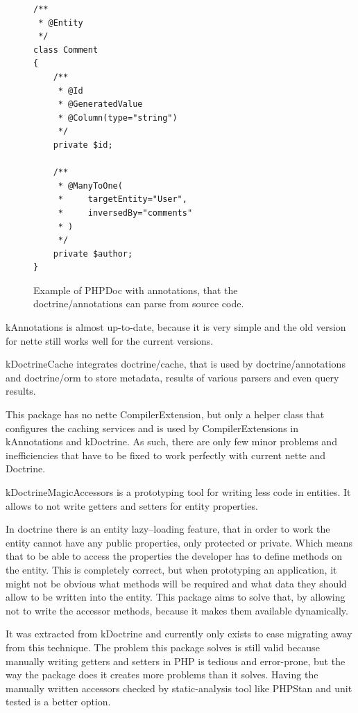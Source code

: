 \begin{figure} \label{fig:php:annotations-example}
\begin{lstlisting}
/**
 * @Entity
 */
class Comment
{
    /**
     * @Id
     * @GeneratedValue
     * @Column(type="string")
     */
    private $id;

    /**
     * @ManyToOne(
     *     targetEntity="User",
     *     inversedBy="comments"
     * )
     */
    private $author;
}
\end{lstlisting}
\caption{Example of PHPDoc with annotations, that the doctrine/annotations can parse from source code.}
\end{figure}

\gls{kAnnotations} is almost up-to-date, because it is very simple and the old version for \gls{nette} still works well for the current versions.

 \label{sec:state:doctrine-cache}

\gls{kDoctrineCache} integrates doctrine/cache, that is used by doctrine/annotations and doctrine/orm to store metadata, results of various parsers and even query results.

This package has no \gls{nette} CompilerExtension, but only a helper class that configures the caching services and is used by CompilerExtensions in \gls{kAnnotations} and \gls{kDoctrine}. As such, there are only few minor problems and inefficiencies that have to be fixed to work perfectly with current \gls{nette} and Doctrine.

 \label{sec:state:doctrine-magic-accessors}

\gls{kDoctrineMagicAccessors} is a prototyping tool for writing less code in entities. It allows to not write getters and setters for entity properties.

In \gls{doctrine} there is an entity lazy--loading feature, that in order to work the entity cannot have any public properties, only protected or private. Which means that to be able to access the properties the developer has to define methods on the entity. This is completely correct, but when prototyping an application, it might not be obvious what methods will be required and what data they should allow to be written into the entity. This package aims to solve that, by allowing not to write the accessor methods, because it makes them available dynamically.

It was extracted from \gls{kDoctrine} and currently only exists to ease migrating away from this technique. The problem this package solves is still valid because manually writing getters and setters in PHP is tedious and error-prone, but the way the package does it creates more problems than it solves. Having the manually written accessors checked by static-analysis tool like PHPStan and unit tested is a better option.

